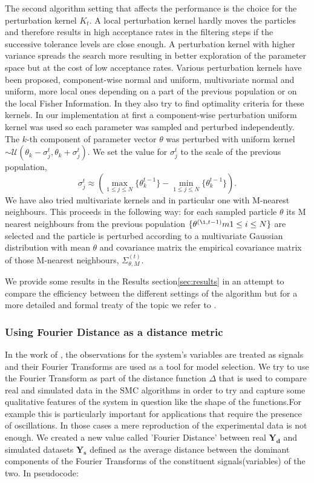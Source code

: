 \documentclass[12pt,a4paper,titlepage]{article}
\begin{document}
The second algorithm setting that affects the performance is the choice for the perturbation kernel $K_{t}$. A local perturbation kernel hardly moves the particles and therefore results in high acceptance rates in the filtering steps if the successive tolerance levels are close enough.  A perturbation kernel with higher variance spreads the search more resulting in better exploration of the parameter space but at the cost of low acceptance rates. Various perturbation kernels have been proposed, component-wise normal and uniform, multivariate normal and uniform, more local ones depending on a part of the previous population or on the local Fisher Information. In \cite{filippi2011optimal} they also try to find optimality criteria for these kernels. In our implementation at first a component-wise perturbation uniform kernel was used so each parameter was sampled and perturbed independently. The $k$-th component of parameter vector $\theta$ was perturbed with uniform kernel $\sim \mathcal{U}(\theta_{k}-\sigma_{j}^{t}, \theta_{k}+\sigma_{j}^{t})$.  We set the value for $\sigma_{j}^{t}$ to the scale of the previous population,
\begin{equation*}
\sigma_{j}^{t} \approx ( \underset{1 \le j \le N}{\max}\{\theta_{k}^{t-1}\} - \underset{1 \le j \le N}{\min}\{\theta_{k}^{t-1}\}).
\end{equation*} 
We have also tried multivariate kernels and in particular one with M-nearest neighbours.  This proceeds in the following way:  for each sampled particle $\theta$ its M nearest neighbours from the previous population $\{ \theta^{(\i, t-1)}m 1 \le i \le N\}$ are selected and the particle is perturbed according to a multivariate Gaussian distribution with mean $\theta$ and covariance matrix the empirical covariance matrix of those M-nearest neighbours, $\Sigma_{\theta, M}^{(t)}$.  

We provide some results in the Results section\ref{sec:results} in an attempt to compare the efficiency between the different settings of the algorithm but for a more detailed and formal treaty of the topic we refer to \cite{filippi2011optimal}. 
\subsubsection{Using Fourier Distance as a distance metric}
In the work of \cite{konopka2010gene}, the observations for the system's variables are treated as signals and their Fourier Transforms are used as a tool for model selection. We try to use the Fourier Transform as part of the distance function $\Delta$ that is used to compare real and simulated data in the SMC algorithms in order to try and capture some qualitative features of the system in question like the shape of the functions.For example this is particularly important for applications that require the presence of oscillations. In those cases a mere reproduction of the experimental data is not enough. We created a new value called 'Fourier Distance' between real $\mathbf{Y_{d}}$ and simulated datasets $\mathbf{Y_{s}}$ defined as the average distance between the dominant components of the Fourier Transforms of the constituent signals(variables) of the two. In pseudocode:
\end{document}
